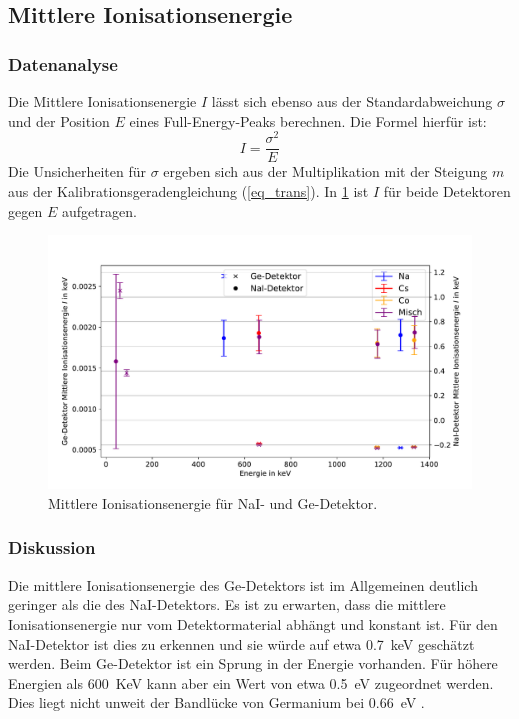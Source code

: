 \documentclass[
	a4paper,
	12pt,
	pagesize,
	ngerman
]{scrartcl}
\begin{document}
\subsection{Mittlere Ionisationsenergie}
\subsubsection{Datenanalyse}
Die Mittlere Ionisationsenergie $I$ lässt sich ebenso aus der Standardabweichung $\sigma$ und der Position $E$ eines Full-Energy-Peaks berechnen.
Die Formel hierfür ist:
\begin{equation}
	I = \frac{\sigma^2}{E}
\end{equation}
Die Unsicherheiten für $\sigma$ ergeben sich aus der Multiplikation mit der Steigung $m$ aus der Kalibrationsgeradengleichung (\ref{eq_trans}).
In \cref{fg_ionisation} ist $I$ für beide Detektoren gegen $E$ aufgetragen.


	\begin{figure}[H]
			\includegraphics[width= 1 \linewidth]{img/ion}
			\caption{
			Mittlere Ionisationsenergie für NaI- und Ge-Detektor.
			}
			\label{fg_ionisation}
	\end{figure}

\subsubsection{Diskussion}

Die mittlere Ionisationsenergie des Ge-Detektors ist im Allgemeinen deutlich geringer als die des NaI-Detektors.
Es ist zu erwarten, dass die mittlere Ionisationsenergie nur vom Detektormaterial abhängt und konstant ist.
Für den NaI-Detektor ist dies zu erkennen und sie würde auf etwa \SI{0,7}{keV} geschätzt werden. %
Beim Ge-Detektor ist ein Sprung in der Energie vorhanden.
Für höhere Energien als \SI{600}{KeV} kann aber ein Wert von etwa \SI{0,5}{eV} zugeordnet werden.
Dies liegt nicht unweit der Bandlücke von Germanium bei \SI{0,66}{eV} \cite{bandlueckeGE}. %
\end{document}
